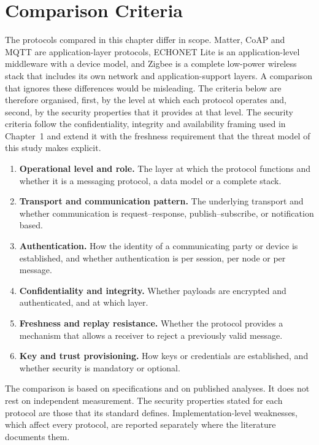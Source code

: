 \section{Comparison Criteria}
\label{sec:criteria}

The protocols compared in this chapter differ in scope. Matter, CoAP and MQTT are application-layer protocols, ECHONET Lite is an application-level middleware with a device model, and Zigbee is a complete low-power wireless stack that includes its own network and application-support layers. A comparison that ignores these differences would be misleading. The criteria below are therefore organised, first, by the level at which each protocol operates and, second, by the security properties that it provides at that level. The security criteria follow the confidentiality, integrity and availability framing used in Chapter~1 and extend it with the freshness requirement that the threat model of this study makes explicit.

\begin{enumerate}
  \item \textbf{Operational level and role.} The layer at which the protocol functions and whether it is a messaging protocol, a data model or a complete stack.
  \item \textbf{Transport and communication pattern.} The underlying transport and whether communication is request--response, publish--subscribe, or notification based.
  \item \textbf{Authentication.} How the identity of a communicating party or device is established, and whether authentication is per session, per node or per message.
  \item \textbf{Confidentiality and integrity.} Whether payloads are encrypted and authenticated, and at which layer.
  \item \textbf{Freshness and replay resistance.} Whether the protocol provides a mechanism that allows a receiver to reject a previously valid message.
  \item \textbf{Key and trust provisioning.} How keys or credentials are established, and whether security is mandatory or optional.
\end{enumerate}


The comparison is based on specifications and on published analyses. It does not rest on independent measurement. The security properties stated for each protocol are those that its standard defines. Implementation-level weaknesses, which affect every protocol, are reported separately where the literature documents them.

